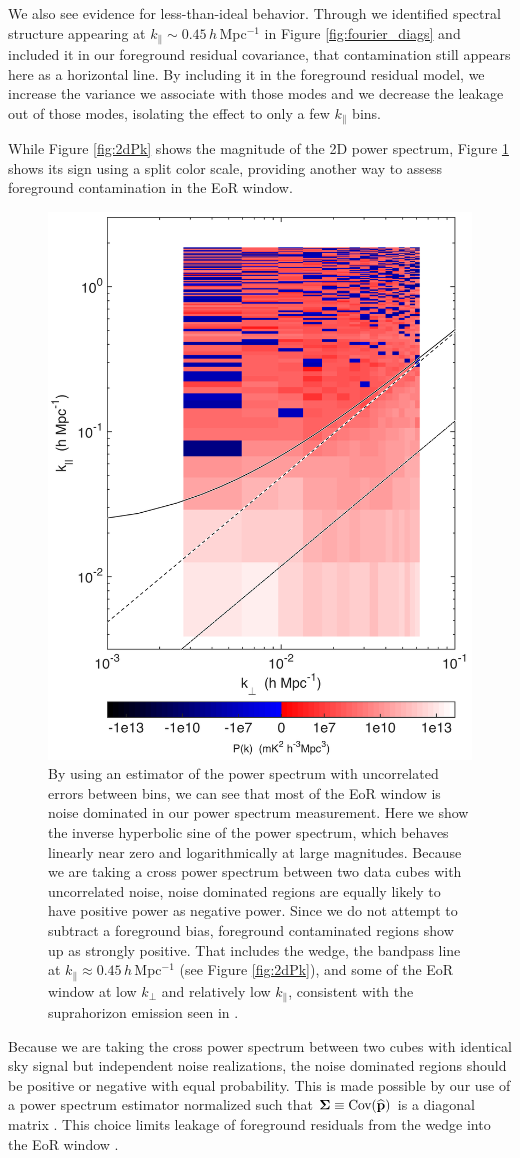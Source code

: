 We also see evidence for less-than-ideal behavior. Through we identified spectral structure appearing at $k_\| \sim 0.45$\,$h$\,Mpc$^{-1}$ in Figure \ref{fig:fourier_diags} and included it in our foreground residual covariance, that contamination still appears here as a horizontal line. By including it in the foreground residual model, we increase the variance we associate with those modes and we decrease the leakage out of those modes, isolating the effect to only a few $k_\|$ bins.

While Figure \ref{fig:2dPk} shows the magnitude of the 2D power spectrum, Figure \ref{fig:2dPkArcSinh} shows its sign using a split color scale, providing another way to assess foreground contamination in the EoR window. 
\begin{figure}[] 
	\centering 
	\includegraphics[width=.48\textwidth]{chap4_empirical_covariance/2dPkArcSinh.png}
	\caption[By using an estimator of the power spectrum with uncorrelated errors between bins, we can see that most of the EoR window is noise dominated.]{By using an estimator of the power spectrum with uncorrelated errors between bins, we can see that most of the EoR window is noise dominated in our power spectrum measurement. Here we show the inverse hyperbolic sine of the power spectrum, which behaves linearly near zero and logarithmically at large magnitudes. Because we are taking a cross power spectrum between two data cubes with uncorrelated noise, noise dominated regions are equally likely to have positive power as negative power. Since we do not attempt to subtract a foreground bias, foreground contaminated regions show up as strongly positive. That includes the wedge, the bandpass line at $k_\| \approx 0.45$\,$h$\,Mpc$^{-1}$  (see Figure \ref{fig:2dPk}), and some of the EoR window at low $k_\perp$ and relatively low $k_\|$, consistent with the suprahorizon emission seen in \cite{pober13}.}
	\label{fig:2dPkArcSinh}
\end{figure}  
Because we are taking the cross power spectrum between two cubes with identical sky signal but independent noise realizations, the noise dominated regions should be positive or negative with equal probability. This is made possible by our use of a power spectrum estimator normalized such that $\boldsymbol\Sigma \equiv \text{Cov}(\widehat{\mathbf{p}})$ is a diagonal matrix \citep{DillonFast}. This choice limits leakage of foreground residuals from the wedge into the EoR window \citep{X13}.

